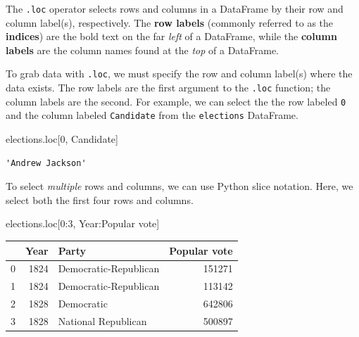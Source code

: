 \documentclass[
  letterpaper,
  DIV=11,
  numbers=noendperiod]{scrreprt}
\newenvironment{Shaded}{\begin{snugshade}}{\end{snugshade}}
\newcommand{\DecValTok}[1]{\textcolor[rgb]{0.68,0.00,0.00}{#1}}
\newcommand{\NormalTok}[1]{\textcolor[rgb]{0.00,0.23,0.31}{#1}}
\newcommand{\StringTok}[1]{\textcolor[rgb]{0.13,0.47,0.30}{#1}}
\begin{document}
The \texttt{.loc} operator selects rows and columns in a DataFrame by
their row and column label(s), respectively. The \textbf{row labels}
(commonly referred to as the \textbf{indices}) are the bold text on the
far \emph{left} of a DataFrame, while the \textbf{column labels} are the
column names found at the \emph{top} of a DataFrame.

To grab data with \texttt{.loc}, we must specify the row and column
label(s) where the data exists. The row labels are the first argument to
the \texttt{.loc} function; the column labels are the second. For
example, we can select the the row labeled \texttt{0} and the column
labeled \texttt{Candidate} from the \texttt{elections} DataFrame.

\begin{Shaded}
\begin{Highlighting}[]
\NormalTok{elections.loc[}\DecValTok{0}\NormalTok{, }\StringTok{\textquotesingle{}Candidate\textquotesingle{}}\NormalTok{]}
\end{Highlighting}
\end{Shaded}

\begin{verbatim}
'Andrew Jackson'
\end{verbatim}

To select \emph{multiple} rows and columns, we can use Python slice
notation. Here, we select both the first four rows and columns.

\begin{Shaded}
\begin{Highlighting}[]
\NormalTok{elections.loc[}\DecValTok{0}\NormalTok{:}\DecValTok{3}\NormalTok{, }\StringTok{\textquotesingle{}Year\textquotesingle{}}\NormalTok{:}\StringTok{\textquotesingle{}Popular vote\textquotesingle{}}\NormalTok{]}
\end{Highlighting}
\end{Shaded}

\begin{tabular}{lrlr}
\toprule
{} &  Year &                  Party &  Popular vote \\
\midrule
0 &  1824 &  Democratic-Republican &        151271 \\
1 &  1824 &  Democratic-Republican &        113142 \\
2 &  1828 &             Democratic &        642806 \\
3 &  1828 &    National Republican &        500897 \\
\bottomrule
\end{tabular}
\end{document}
